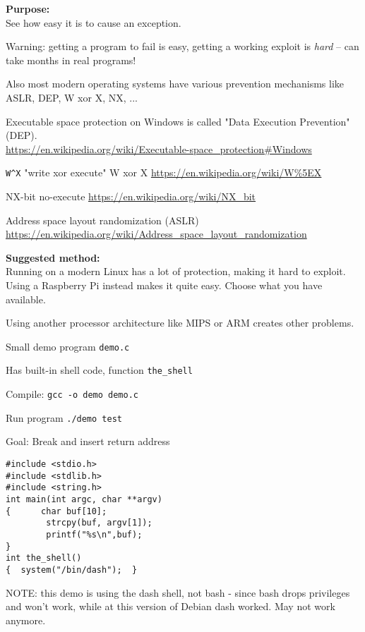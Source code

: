 \documentclass[a4paper,11pt,notitlepage]{report}
\begin{document}
{\bf Purpose:}\\
See how easy it is to cause an exception.

Warning: getting a program to fail is easy, getting a working exploit is \emph{hard} -- can take months in real programs!

Also most modern operating systems have various prevention mechanisms like ASLR, DEP, W xor X, NX, ...

\begin{list2}
\item Executable space protection on Windows is called "Data Execution Prevention" (DEP).\\
\url{https://en.wikipedia.org/wiki/Executable-space_protection#Windows}
\item \verb+W^X+ "write xor execute" W xor X \url{https://en.wikipedia.org/wiki/W%5EX}
\item NX-bit no-execute \url{https://en.wikipedia.org/wiki/NX_bit}
\item Address space layout randomization (ASLR) \url{https://en.wikipedia.org/wiki/Address_space_layout_randomization}
\end{list2}

{\bf Suggested method:}\\
Running on a modern Linux has a lot of protection, making it hard to exploit. Using a Raspberry Pi instead makes it quite easy. Choose what you have available.

Using another processor architecture like MIPS or ARM creates other problems.

\begin{list2}
\item Small demo program \verb+demo.c+
\item Has built-in shell code, function \verb+the_shell+
\item Compile:
\verb+gcc -o demo demo.c+
\item Run program
\verb+./demo test+
\item Goal: Break and insert return address
\end{list2}

\begin{verbatim}
#include <stdio.h>
#include <stdlib.h>
#include <string.h>
int main(int argc, char **argv)
{      char buf[10];
        strcpy(buf, argv[1]);
        printf("%s\n",buf);
}
int the_shell()
{  system("/bin/dash");  }
\end{verbatim}

NOTE: this demo is using the dash shell, not bash - since bash drops privileges and won't work, while at this version of Debian dash worked. May not work anymore.
\end{document}
